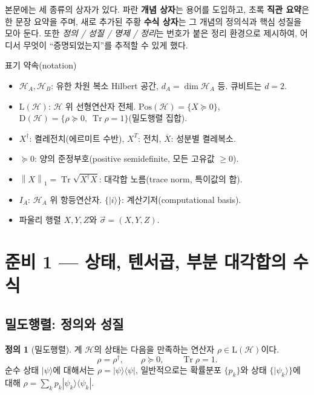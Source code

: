 \documentclass[11pt,a4paper]{article}
\newcommand{\Hcal}{\mathcal{H}}
\newcommand{\Tr}{\operatorname{Tr}}
\newcommand{\Pos}{\mathrm{Pos}}
\newcommand{\Dens}{\mathrm{D}}
\newcommand{\Lin}{\mathrm{L}}
\newcommand{\onenorm}[1]{\left\lVert #1 \right\rVert_{1}}
\theoremstyle{definition}
\newtheorem{definition}{정의}[section]
\theoremstyle{plain}
\theoremstyle{remark}
\begin{document}
본문에는 세 종류의 상자가 있다. 파란 \textbf{개념 상자}는 용어를 도입하고, 초록 \textbf{직관 요약}은 한 문장 요약을 주며, 새로 추가된 주황 \textbf{수식 상자}는 그 개념의 정의식과 핵심 성질을 모아 둔다. 또한 \emph{정의 / 성질 / 명제 / 정리}는 번호가 붙은 정리 환경으로 제시하여, 어디서 무엇이 ``증명되었는지''를 추적할 수 있게 했다.

\begin{conceptbox}{표기 약속(notation)}
\begin{itemize}[leftmargin=1.4em]
  \item $\Hcal_A,\Hcal_B$: 유한 차원 복소 Hilbert 공간, $d_A=\dim\Hcal_A$ 등. 큐비트는 $d=2$.
  \item $\Lin(\Hcal)$: $\Hcal$ 위 선형연산자 전체. $\Pos(\Hcal)=\{X\succeq0\}$, $\Dens(\Hcal)=\{\rho\succeq0,\ \Tr\rho=1\}$(밀도행렬 집합).
  \item $X^\dagger$: 켤레전치(에르미트 수반), $X^T$: 전치, $\overline{X}$: 성분별 켤레복소.
  \item $\succeq0$: 양의 준정부호(positive semidefinite, 모든 고유값 $\ge0$).
  \item $\onenorm{X}=\Tr\sqrt{X^\dagger X}$: 대각합 노름(trace norm, 특이값의 합).
  \item $I_A$: $\Hcal_A$ 위 항등연산자. $\{|i\rangle\}$: 계산기저(computational basis).
  \item 파울리 행렬 $X,Y,Z$와 $\vec\sigma=(X,Y,Z)$.
\end{itemize}
\end{conceptbox}

\section{준비 1 --- 상태, 텐서곱, 부분 대각합의 수식}

\subsection{밀도행렬: 정의와 성질}

\begin{definition}[밀도행렬]
계 $\Hcal$의 상태는 다음을 만족하는 연산자 $\rho\in\Lin(\Hcal)$이다.
\[
\rho=\rho^\dagger,\qquad \rho\succeq0,\qquad \Tr\rho=1 .
\]
순수 상태 $|\psi\rangle$에 대해서는 $\rho=|\psi\rangle\langle\psi|$, 일반적으로는 확률분포 $\{p_k\}$와 상태 $\{|\psi_k\rangle\}$에 대해 $\rho=\sum_k p_k|\psi_k\rangle\langle\psi_k|$.
\end{definition}
\end{document}

